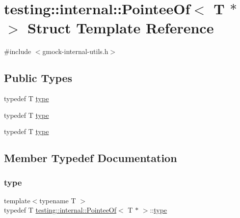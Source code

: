 \hypertarget{structtesting_1_1internal_1_1_pointee_of_3_01_t_01_5_01_4}{}\section{testing\+::internal\+::Pointee\+Of$<$ T $\ast$ $>$ Struct Template Reference}
\label{structtesting_1_1internal_1_1_pointee_of_3_01_t_01_5_01_4}


{\ttfamily \#include $<$gmock-\/internal-\/utils.\+h$>$}

\subsection*{Public Types}
\begin{DoxyCompactItemize}
\item 
typedef T \mbox{\hyperlink{structtesting_1_1internal_1_1_pointee_of_3_01_t_01_5_01_4_a91dde514cd3a8c07cedbe5336c36a55f}{type}}
\item 
typedef T \mbox{\hyperlink{structtesting_1_1internal_1_1_pointee_of_3_01_t_01_5_01_4_a91dde514cd3a8c07cedbe5336c36a55f}{type}}
\item 
typedef T \mbox{\hyperlink{structtesting_1_1internal_1_1_pointee_of_3_01_t_01_5_01_4_a91dde514cd3a8c07cedbe5336c36a55f}{type}}
\end{DoxyCompactItemize}


\subsection{Member Typedef Documentation}
\mbox{\label{structtesting_1_1internal_1_1_pointee_of_3_01_t_01_5_01_4_a91dde514cd3a8c07cedbe5336c36a55f}} 
\subsubsection{\texorpdfstring{type}{type}\hspace{0.1cm}{\footnotesize\ttfamily [1/3]}}
{\footnotesize\ttfamily template$<$typename T $>$ \\
typedef T \mbox{\hyperlink{structtesting_1_1internal_1_1_pointee_of}{testing\+::internal\+::\+Pointee\+Of}}$<$ T $\ast$ $>$\+::\mbox{\hyperlink{structtesting_1_1internal_1_1_pointee_of_3_01_t_01_5_01_4_a91dde514cd3a8c07cedbe5336c36a55f}{type}}}

